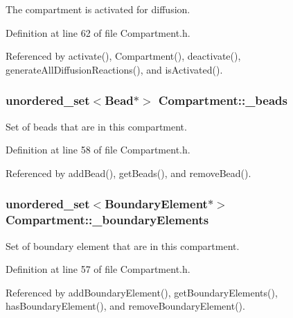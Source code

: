 The compartment is activated for diffusion. 



Definition at line 62 of file Compartment.\+h.



Referenced by activate(), Compartment(), deactivate(), generate\+All\+Diffusion\+Reactions(), and is\+Activated().

\hypertarget{classCompartment_a9da94d9a1b486007a4572865dcfcd474}{
\subsubsection[{\+\_\+beads}]{\setlength{\rightskip}{0pt plus 5cm}unordered\+\_\+set$<${\bf Bead}$\ast$$>$ Compartment\+::\+\_\+beads\hspace{0.3cm}{\ttfamily [protected]}}}\label{classCompartment_a9da94d9a1b486007a4572865dcfcd474}


Set of beads that are in this compartment. 



Definition at line 58 of file Compartment.\+h.



Referenced by add\+Bead(), get\+Beads(), and remove\+Bead().

\hypertarget{classCompartment_aa582b3db6d4bef92ec7c7b7e639d0a09}{
\subsubsection[{\+\_\+boundary\+Elements}]{\setlength{\rightskip}{0pt plus 5cm}unordered\+\_\+set$<${\bf Boundary\+Element}$\ast$$>$ Compartment\+::\+\_\+boundary\+Elements\hspace{0.3cm}{\ttfamily [protected]}}}\label{classCompartment_aa582b3db6d4bef92ec7c7b7e639d0a09}


Set of boundary element that are in this compartment. 



Definition at line 57 of file Compartment.\+h.



Referenced by add\+Boundary\+Element(), get\+Boundary\+Elements(), has\+Boundary\+Element(), and remove\+Boundary\+Element().

